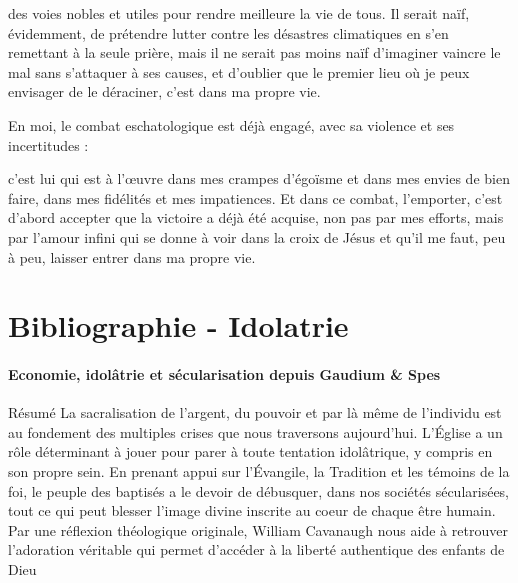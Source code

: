  
\begin{singlequote}
        
des voies nobles et utiles pour rendre meilleure la vie de tous. Il serait naïf, évidemment, de prétendre lutter contre les désastres climatiques en s'en remettant à la seule prière, mais il ne serait pas moins naïf d'imaginer vaincre le mal sans s'attaquer à ses causes, et d'oublier que le premier lieu où je peux envisager de le déraciner, c'est dans ma propre vie.

En moi, le combat eschatologique est déjà engagé, avec sa violence et ses incertitudes :

c'est lui qui est à l'œuvre dans mes crampes d’égoïsme et dans mes envies de bien faire, dans mes fidélités et mes impatiences. Et dans ce combat, l'emporter, c'est d'abord accepter que la victoire a déjà été acquise, non pas par mes efforts, mais par l'amour infini qui se donne à voir dans la croix de Jésus et qu'il me faut, peu à peu, laisser entrer dans ma propre vie.
\end{singlequote}



\section{Bibliographie - Idolatrie}


\paragraph{Economie, idolâtrie et sécularisation depuis Gaudium \& Spes}
    \cite{cavanaugh_idolatrie_2022}
    Résumé 	La sacralisation de l'argent, du pouvoir et par là même de l'individu est au fondement des multiples crises que nous traversons aujourd'hui. L'Église a un rôle déterminant à jouer pour parer à toute tentation idolâtrique, y compris en son propre sein. En prenant appui sur l'Évangile, la Tradition et les témoins de la foi, le peuple des baptisés a le devoir de débusquer, dans nos sociétés sécularisées, tout ce qui peut blesser l'image divine inscrite au coeur de chaque être humain. Par une réflexion théologique originale, William Cavanaugh nous aide à retrouver l'adoration véritable qui permet d'accéder à la liberté authentique des enfants de Dieu
    
